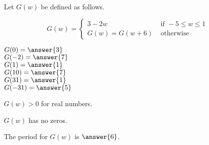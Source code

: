 \documentclass{ximera}
\author{Lee Wayand}
\begin{document}
\begin{exercise}




Let $G(w)$ be defined as follows.

\[
G(w) = 
\begin{cases}
  3 - 2w & \text{ if } -5 \le w \leq 1 \\
  G(w) = G(w+6) & \text{ otherwise } 
\end{cases}
\]


\begin{question}

$G(0) = \answer{3}$ \\


$G(-2) = \answer{7}$ \\


$G(1) = \answer{1}$ \\


$G(10) = \answer{7}$ \\


$G(31) = \answer{1}$ \\


$G(-31) = \answer{5}$ \\


\end{question}






\begin{question}


$G(w) > 0$ for real numbers.

\begin{multipleChoice}
\end{multipleChoice}

\end{question}






\begin{question}


$G(w)$ has no zeros.

\begin{multipleChoice}
\end{multipleChoice}

\end{question}






\begin{question}


The period for $G(w)$ is $\answer{6}$.


\end{question}








\end{exercise}
\end{document}
